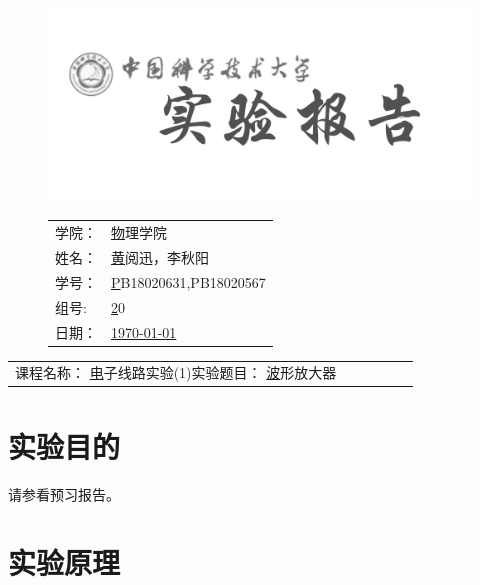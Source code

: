 \documentclass[a4paper,11pt,UTF8]{ctexart}
\newcommand{\major}{物理学院}
\newcommand{\name}{黄阅迅，李秋阳}
\newcommand{\stuid}{PB18020631,PB18020567}
\newcommand{\group}{20}
\newcommand{\newdate}{\today}
\newcommand{\course}{电子线路实验(1)}
\newcommand{\newtitle}{波形放大器}
\begin{document}
\thispagestyle{empty}
\begin{figure}[h]
  \begin{minipage}{0.6\linewidth}
    \centerline{\includegraphics[width=\linewidth]{logo.png}}
  \end{minipage}
  \hfill
  \begin{minipage}{.4\linewidth}
    \raggedleft
    \begin{tabular*}{.8\linewidth}{ll}
      学院： & \underline\major   \\
      姓名： & \underline\name    \\
      学号： & \underline\stuid   \\
      组号:  & \underline\group   \\
      日期： & \underline\newdate \\
    \end{tabular*}
  \end{minipage}
\end{figure}

\begin{table}[!htbp]
  \centering
  \begin{tabular*}{\linewidth}{llllll}
    课程名称：  \underline\course   \qquad\qquad 实验题目：  \underline\newtitle  
  \end{tabular*}
\end{table}


\section{实验目的}

请参看预习报告。

\section{实验原理}
\end{document}
